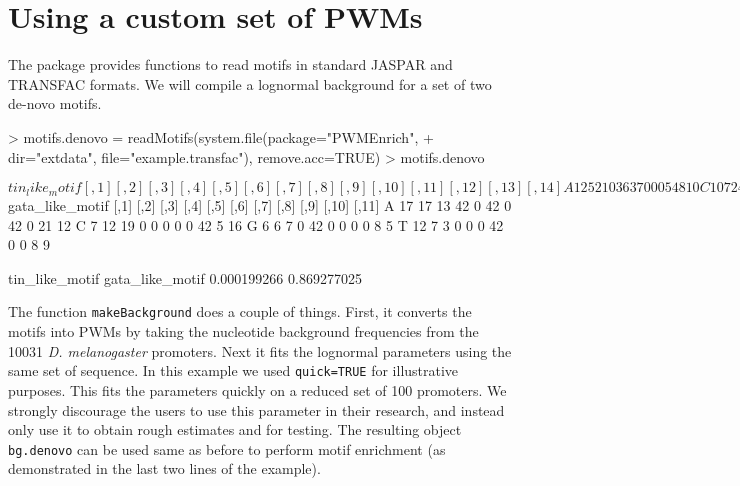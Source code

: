 \documentclass{article}
\newcommand{\Robj}[1]{{\texttt{#1}}}
\begin{document}
\section{Using a custom set of PWMs}\label{sec:custom-pwm}

The package provides functions to read motifs in standard JASPAR and TRANSFAC formats. We will compile a lognormal background for a set of two de-novo motifs. 

\begin{Schunk}
\begin{Sinput}
> motifs.denovo = readMotifs(system.file(package="PWMEnrich", 
+   dir="extdata", file="example.transfac"), remove.acc=TRUE)
> motifs.denovo
\end{Sinput}
\begin{Soutput}
$tin_like_motif
  [,1] [,2] [,3] [,4] [,5] [,6] [,7] [,8] [,9] [,10] [,11] [,12] [,13] [,14]
A   12    5    2    1    0   36   37    0    0     0     5     4     8    10
C   10    7   24    0   36    0    0    1    0     0     6    19     8     4
G   10   13    6    0    0    1    0   36    0    36    22     7     6     8
T    5   12    5   36    1    0    0    0   37     1     4     7    15    15

$gata_like_motif
  [,1] [,2] [,3] [,4] [,5] [,6] [,7] [,8] [,9] [,10] [,11]
A   17   17   13   42    0   42    0   42    0    21    12
C    7   12   19    0    0    0    0    0   42     5    16
G    6    6    7    0   42    0    0    0    0     8     5
T   12    7    3    0    0    0   42    0    0     8     9
\end{Soutput}
\begin{Soutput}
 tin_like_motif gata_like_motif 
    0.000199266     0.869277025 
\end{Soutput}
\end{Schunk}

The function \Robj{makeBackground} does a couple of things. First, it converts the motifs into PWMs by taking the nucleotide background frequencies from the 10031 \textit{D. melanogaster} promoters. Next it fits the lognormal parameters using the same set of sequence. In this example we used \Robj{quick=TRUE} for illustrative purposes. This fits the parameters quickly on a reduced set of 100 promoters. We strongly discourage the users to use this parameter in their research, and instead only use it to obtain rough estimates and for testing. The resulting object \Robj{bg.denovo} can be used same as before to perform motif enrichment (as demonstrated in the last two lines of the example).
\end{document}
